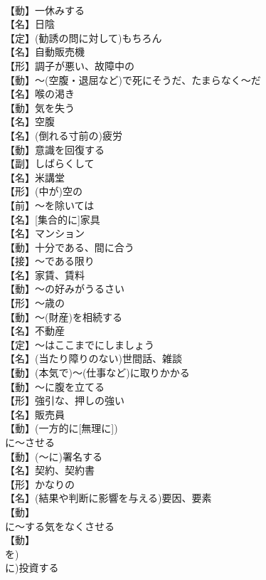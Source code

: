 \documentclass[8pt]{extreport}
\begin{document}
\begin{CJK}{UTF8}{min}
\\	【動】一休みする
\\	【名】日陰
\\	【定】(勧誘の問に対して)もちろん
\\	【名】自動販売機
\\	【形】調子が悪い、故障中の
\\	【動】～(空腹・退屈など)で死にそうだ、たまらなく～だ
\\	【名】喉の渇き
\\	【動】気を失う
\\	【名】空腹
\\	【名】(倒れる寸前の)疲労
\\	【動】意識を回復する
\\	【副】しばらくして
\\	【名】{米}講堂
\\	【形】(中が)空の
\\	【前】～を除いては
\\	【名】[集合的に]家具
\\	【名】マンション
\\	【動】十分である、間に合う
\\	【接】～である限り
\\	【名】家賃、賃料
\\	【動】～の好みがうるさい
\\	【形】～歳の
\\	【動】～(財産)を相続する
\\	【名】不動産
\\	【定】～はここまでにしましょう
\\	【名】(当たり障りのない)世間話、雑談
\\	【動】(本気で)～(仕事など)に取りかかる
\\	【動】～に腹を立てる
\\	【形】強引な、押しの強い
\\	【名】販売員
\\	【動】(一方的に[無理に])
\\	に～させる
\\	【動】(～に)署名する
\\	【名】契約、契約書
\\	【形】かなりの
\\	【名】(結果や判断に影響を与える)要因、要素
\\	【動】
\\	に～する気をなくさせる
\\	【動】
\\	を)
\\	に)投資する

\end{CJK}
\end{document}

